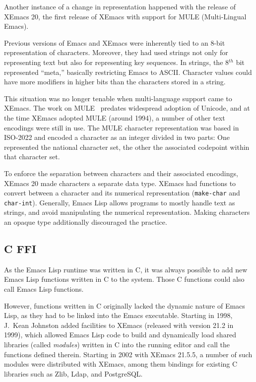 \documentclass[format=acmsmall, review]{acmart}
\newcommand \Elisp {Emacs Lisp}
\begin{document}
Another instance of a change in representation happened with the
release of XEmacs 20, the first release of XEmacs with support for
MULE (Multi-Lingual Emacs).

Previous versions of Emacs and XEmacs were inherently tied to an 8-bit
representation of characters.  Moreover, they had used strings not
only for representing text but also for representing key sequences.
In strings, the 8$^{th}$ bit represented ``meta,'' basically restricting
Emacs to ASCII.  Character values could have more
modifiers in higher bits than the characters stored in a string.

This situation was no longer tenable when multi-language support came
to XEmacs.  The work on MULE~\cite{Ohmaki2002} predates widespread
adoption of Unicode, and at the time XEmacs adopted MULE (around
1994), a number of other text encodings were still in use.  The MULE
character representation was based in ISO-2022 and encoded a character as an
integer divided in two parts: One represented the national character set,
the other the associated codepoint within that character set.

To enforce the separation between characters and their associated
encodings, XEmacs 20 made characters a separate data type.  XEmacs had
functions to convert between a character and its numerical
representation (\texttt{make-char} and \texttt{char-int}).  Generally,
\Elisp{} allows programs to mostly handle text as strings,
and avoid manipulating the numerical representation.  Making
characters an opaque type additionally discouraged the practice.

\subsection{C FFI}

As the \Elisp{} runtime was written in C, it was always possible to
add new \Elisp{} functions written in C to the system.  Those C
functions could also call \Elisp{} functions.

However, functions written in C originally lacked the dynamic nature
of \Elisp{}, as they had to be linked into the Emacs executable.
Starting in 1998, J.\ Kean Johnston added facilities to XEmacs
(released with version 21.2 in 1999), which allowed \Elisp{} code to
build and dynamically load shared libraries (called \textit{modules})
written in C into the running editor and call the functions defined
therein.  Starting in 2002 with XEmacs 21.5.5, a number of such modules
were distributed with XEmacs, among them bindings for existing C
libraries such as Zlib, Ldap, and PostgreSQL.
\end{document}
